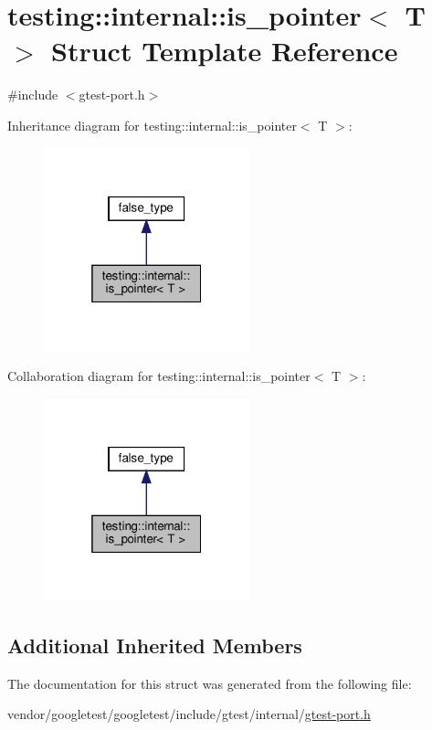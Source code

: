 \hypertarget{structtesting_1_1internal_1_1is__pointer}{}\section{testing\+:\+:internal\+:\+:is\+\_\+pointer$<$ T $>$ Struct Template Reference}
\label{structtesting_1_1internal_1_1is__pointer}


{\ttfamily \#include $<$gtest-\/port.\+h$>$}



Inheritance diagram for testing\+:\+:internal\+:\+:is\+\_\+pointer$<$ T $>$\+:
\nopagebreak
\begin{figure}[H]
\begin{center}
\leavevmode
\includegraphics[width=169pt]{structtesting_1_1internal_1_1is__pointer__inherit__graph}
\end{center}
\end{figure}


Collaboration diagram for testing\+:\+:internal\+:\+:is\+\_\+pointer$<$ T $>$\+:
\nopagebreak
\begin{figure}[H]
\begin{center}
\leavevmode
\includegraphics[width=169pt]{structtesting_1_1internal_1_1is__pointer__coll__graph}
\end{center}
\end{figure}
\subsection*{Additional Inherited Members}


The documentation for this struct was generated from the following file\+:\begin{DoxyCompactItemize}
\item 
vendor/googletest/googletest/include/gtest/internal/\hyperlink{gtest-port_8h}{gtest-\/port.\+h}\end{DoxyCompactItemize}
